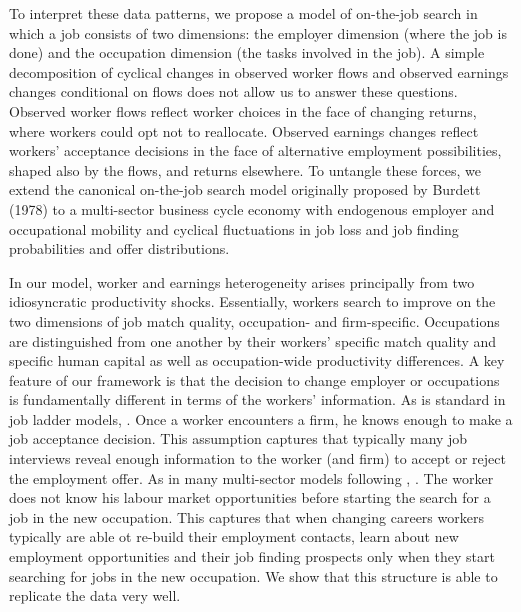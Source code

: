 \documentclass[12pt]{article}
\newcommand{\highlightR}[1]{{\emph{\color{MyRed}{#1}}}}
\newcommand{\highlightO}[1]{{\emph{\color{MyOrange}{#1}}}}
\theoremstyle{definition}
\begin{document}
To interpret these data patterns, we propose a model of on-the-job search in which a job consists of two dimensions: the employer dimension (where the job is done) and the occupation dimension (the tasks involved in the job). \highlightR{We use this framework to investigate (i) whether cyclical changes in the earnings risk arise from the occupation or from the employer dimension, and (ii) whether the importance of each dimension arises from cyclical changes in returns to mobility or from cyclical changes on worker flows.} A simple decomposition of cyclical changes in observed worker flows and observed earnings changes conditional on flows does not allow us to answer these questions. Observed worker flows reflect worker choices in the face of changing returns, where workers could opt not to reallocate. Observed earnings changes reflect workers' acceptance decisions in the face of alternative employment possibilities, shaped also by the flows, and returns elsewhere. To untangle these forces, we extend the canonical on-the-job search model originally proposed by Burdett (1978)  to a multi-sector business cycle economy with endogenous employer and occupational mobility and  cyclical fluctuations in job loss and job finding probabilities and offer distributions.

In our model, worker and earnings heterogeneity arises principally from two idiosyncratic productivity shocks. Essentially, workers search to improve on the two dimensions of job match quality, occupation- and firm-specific. Occupations are distinguished from one another by their workers' specific match quality and specific human capital as well as occupation-wide productivity differences. A key feature of our framework is that the decision to change employer or occupations is fundamentally different in terms of the workers' information. As is standard in job ladder models, \highlightO{meetings with employers are treated akin to ``inspection'' goods}. Once a worker encounters a firm, he knows enough to make a job acceptance decision. This assumption captures that typically many job interviews reveal enough information to the worker (and firm) to accept or reject the employment offer. As in many multi-sector models following \citet{lucasEquilibriumSearchUnemployment1974}, \highlightO{the decision to change occupations is instead treated akin to an ``experience'' good}. The worker does not know his labour market opportunities before starting the search for a job in the new occupation. This captures that when changing careers workers typically are able ot re-build their employment contacts, learn about new employment opportunities and their job finding prospects only when they start searching for jobs in the new occupation. We show that this structure is able to replicate the data very well.
\end{document}
